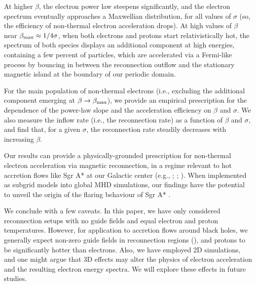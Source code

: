 At higher $\beta$, the electron power law steepens significantly, and the electron spectrum eventually approaches a Maxwellian distribution, for all values of $\sigma$ (so, the efficiency of non-thermal electron acceleration drops). At high values of $\beta$ near $\beta_{\rm max}\approx1/4\sigma$, when both electrons and protons start relativistically hot, the spectrum of both species displays an additional component at high energies, containing a few percent of particles, which are accelerated via a Fermi-like process by bouncing in between the reconnection outflow and the stationary magnetic island at the boundary of our periodic domain.

For the main population of non-thermal electrons (i.e., excluding the additional component emerging at $\beta\rightarrow \beta_{\rm max}$),
we provide an empirical prescription for the dependence of the power-law slope and the acceleration efficiency on $\beta$ and $\sigma$. We also measure the inflow rate (i.e., the reconnection rate) as a function of $\beta$ and $\sigma$, and find that, for a given $\sigma$, the reconnection rate steadily decreases with increasing $\beta$.

Our results can provide a physically-grounded prescription for non-thermal electron acceleration via magnetic reconnection, in a regime relevant to hot accretion flows like Sgr A* at our Galactic center (e.g., \citealt{ball2016}; \citealt{mao2017}; \citealt{chael2017}). When implemented as subgrid models into global MHD simulations, our findings have the potential to unveil the origin of the flaring behaviour of Sgr A* \citep{ponti17}.

We conclude with a few caveats. In this paper, we have only considered reconnection setups with no guide fields and equal electron and proton temperatures.  However, for application to accretion flows around black holes, we generally expect non-zero guide fields in reconnection regions (\citealt{ball2017}), and protons to be significantly hotter than electrons.  Also, we have employed 2D simulations, and one might argue that 3D effects may alter the physics of electron acceleration and the resulting electron energy spectra.
 We will explore these effects in future studies.






